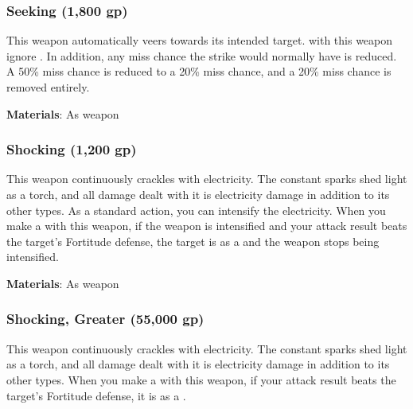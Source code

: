 \lowercase{\hypertarget{item:Seeking}{}}\label{item:Seeking}
\hypertarget{item:Seeking}{\subsubsection{Seeking\hfill{} (1,800 gp)}}

This weapon automatically veers towards its intended target.
 with this weapon ignore .
In addition, any miss chance the strike would normally have is reduced.
A 50\% miss chance is reduced to a 20\% miss chance, and a 20\% miss chance is removed entirely.



\vspace{0.25em}
\textbf{Materials}: As weapon


\lowercase{\hypertarget{item:Shocking}{}}\label{item:Shocking}
\hypertarget{item:Shocking}{\subsubsection{Shocking\hfill{} (1,200 gp)}}

This weapon continuously crackles with electricity.
The constant sparks shed light as a torch, and all damage dealt with it is electricity damage in addition to its other types.
As a standard action, you can intensify the electricity.
When you make a  with this weapon, if the weapon is intensified and your attack result beats the target's Fortitude defense,
the target is \dazed as a  and the weapon stops being intensified.



\vspace{0.25em}
\textbf{Materials}: As weapon


\lowercase{\hypertarget{item:Shocking, Greater}{}}\label{item:Shocking, Greater}
\hypertarget{item:Shocking, Greater}{\subsubsection{Shocking, Greater\hfill{} (55,000 gp)}}

This weapon continuously crackles with electricity.
The constant sparks shed light as a torch, and all damage dealt with it is electricity damage in addition to its other types.
When you make a  with this weapon, if your attack result beats the target's Fortitude defense, it is \dazed as a .



